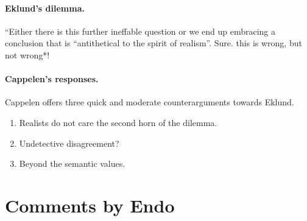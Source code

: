 \documentclass[
10pt, %
a4paper, %
twocolumn, %
landscape %
]{article}
\begin{document}
\paragraph{Eklund's dilemma.}
``Either there is this further ineffable question or we end up embracing a conclusion that is ``antithetical to the spirit of realism''. Sure. this is wrong, but not wrong*!

\paragraph{Cappelen's responses.}
Cappelen offers three quick and moderate counterarguments towards Eklund.

\begin{enumerate}
  \item Realists do not care the second horn of the dilemma.
  \item Undetective disagreement?
  \item Beyond the semantic values.
\end{enumerate}

\section*{Comments by Endo}



\end{document}
